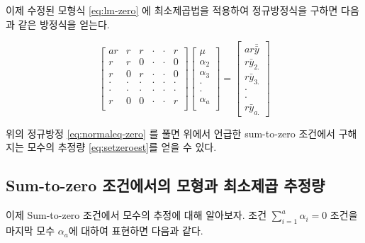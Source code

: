 \documentclass[
  10pt,
]{book}
\theoremstyle{definition}
\theoremstyle{definition}
\theoremstyle{definition}
\theoremstyle{definition}
\theoremstyle{remark}
\begin{document}
이제 수정된 모형식 \eqref{eq:lm-zero} 에 최소제곱법을 적용하여 정규방정식을 구하면 다음과 같은 방정식을 얻는다.

\begin{equation}
\begin{bmatrix}
ar   & r & r & \cdot & \cdot & r \\
r & r &  0  & \cdot & \cdot & 0 \\
r & 0   & r  & \cdot & \cdot & 0 \\
\cdot & \cdot   & \cdot  & \cdot & \cdot & \cdot \\
\cdot & \cdot   & \cdot  & \cdot & \cdot & \cdot \\
r & 0   &  0   & \cdot & \cdot & r \\
\end{bmatrix}
\begin{bmatrix}
\mu \\
\alpha_{2} \\
\alpha_{3} \\
\cdot \\
\cdot \\
\alpha_{a} \\
\end{bmatrix}
=
\begin{bmatrix}
ar \bar {\bar y} \\
r {\bar y}_{2.}\\
r \bar y_{3.}\\
\cdot \\
\cdot \\
r \bar y_{a.}
\end{bmatrix}
\label{eq:normaleq-zero}
\end{equation}

위의 정규방정 \eqref{eq:normaleq-zero} 를 풀면 위에서 언급한 sum-to-zero 조건에서 구해지는 모수의 추정량 \eqref{eq:setzeroest}를 얻을 수 있다.

\hypertarget{sum-to-zero-uxc870uxac74uxc5d0uxc11cuxc758-uxbaa8uxd615uxacfc-uxcd5cuxc18cuxc81cuxacf1-uxcd94uxc815uxb7c9}{%
\subsection{Sum-to-zero 조건에서의 모형과 최소제곱 추정량}\label{sum-to-zero-uxc870uxac74uxc5d0uxc11cuxc758-uxbaa8uxd615uxacfc-uxcd5cuxc18cuxc81cuxacf1-uxcd94uxc815uxb7c9}}

이제 Sum-to-zero 조건에서 모수의 추정에 대해 알아보자. 조건 \(\sum_{i=1}^a \alpha_i =0\) 조건을 마지막 모수 \(\alpha_a\)에 대하여 표현하면 다음과 같다.
\end{document}
